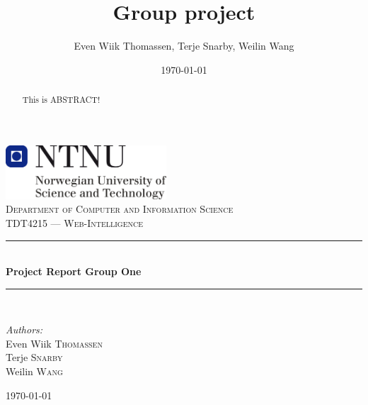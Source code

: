\documentclass[11pt,a4paper]{report}
\title{Group project}
\author{Even Wiik Thomassen, Terje Snarby, Weilin Wang}
\date{\today}
\begin{document}
\begin{titlepage}
\begin{center}
\includegraphics[width=0.45\textwidth]{./img/NTNU-logo.png}\\[5cm]
\textsc{\large Department of Computer and Information Science}\\[0.2cm]
\textsc{\Large TDT4215 --- Web-Intelligence}\\[0.5cm]

\rule{\linewidth}{0.2mm} \\[0.4cm]
{ \LARGE \bfseries Project Report Group One}\\[0.2cm]
\rule{\linewidth}{0.2mm} \\[1.5cm]

\begin{minipage}{0.4\textwidth}
\begin{flushleft} \large
\emph{Authors:}\\
Even Wiik \textsc{Thomassen}\\
Terje \textsc{Snarby}\\
Weilin \textsc{Wang}
\end{flushleft}
\end{minipage}

\vfill
{\large \today}
\end{center}
\end{titlepage}


\begin{abstract}
This is ABSTRACT!
\end{abstract}


\clearpage
{}
{}
\tableofcontents






\clearpage
{}






\end{document}
